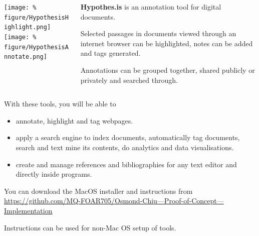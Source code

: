 \documentclass[unknownkeysallowed,usepdftitle=false, parskip=full, aspectratio=169]{beamer}
\newcommand{\secvariable}{nothing}
\newcommand{\mysection}[1]{\renewcommand{\secvariable}{#1}
}
\begin{document}
\begin{frame}\label{\secvariable}
  \begin{columns}[t]
  \begin{column}[c]{0.45\textwidth}
\texttt{[image: \%
figure/HypothesisHighlight.png]}\\
\vspace{1pt}
\texttt{[image: \%
figure/HypothesisAnnotate.png]}
    \end{column}
    \begin{column}[c]{0.45\textwidth}
    \parbox{\linewidth}{

\textbf{Hypothes.is} is an annotation tool for digital documents.\par
\vspace{12pt}
Selected passages in documents viewed through an internet browser can be highlighted, notes can be added and tags generated.\par
\vspace{12pt}
Annotations can be grouped together, shared publicly or privately and searched through. 
}
    \end{column}
    
  \end{columns}


\end{frame}

\mysection{conclusion}
\begin{frame}\label{\secvariable}
  
With these tools, you will be able to  
  \begin{itemize}
   \item annotate, highlight and tag webpages. 
  \item apply a search engine to index documents, automatically tag documents, search and text mine its contents, do analytics and data visualisations.
  \item create and manage references and bibliographies for any text editor and directly inside programs.

  \end{itemize}

  \vspace{0.5cm}
You can download the MacOS installer and instructions from \href{https://github.com/MQ-FOAR705/Osmond-Chiu---Proof-of-Concept---Implementation}{https://github.com/MQ-FOAR705/Osmond-Chiu---Proof-of-Concept---Implementation}\par 
\vspace{0.5cm}
Instructions can be used for non-Mac OS setup of tools.
\end{frame}
\end{document}

